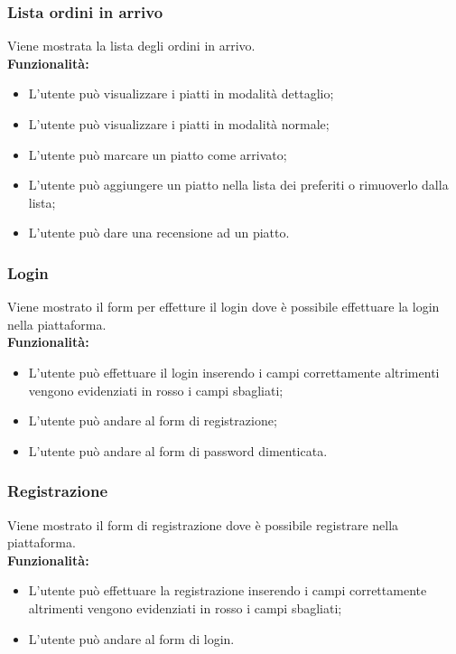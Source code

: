 \subsubsection{Lista ordini in arrivo}
Viene mostrata la lista degli ordini in arrivo.\\
\textbf{Funzionalità:}
\begin{itemize}
    \item L'utente può visualizzare i piatti in modalità dettaglio;
    \item L'utente può visualizzare i piatti in modalità normale;
    \item L'utente può marcare un piatto come arrivato;
    \item L'utente può aggiungere un piatto nella lista dei preferiti o rimuoverlo dalla lista;
    \item L'utente può dare una recensione ad un piatto.
\end{itemize}


\subsubsection{Login}
Viene mostrato il form per effetture il login dove è possibile effettuare la login nella piattaforma.\\
\textbf{Funzionalità:}
\begin{itemize}
    \item L'utente può effettuare il login inserendo i campi correttamente altrimenti vengono evidenziati in rosso i campi sbagliati;
    \item L'utente può andare al form di registrazione;
    \item L'utente può andare al form di password dimenticata.
\end{itemize}

\subsubsection{Registrazione}
Viene mostrato il form di registrazione dove è possibile registrare nella piattaforma.\\
\textbf{Funzionalità:}
\begin{itemize}
    \item L'utente può effettuare la registrazione inserendo i campi correttamente altrimenti vengono evidenziati in rosso i campi sbagliati;
    \item L'utente può andare al form di login.
\end{itemize}


